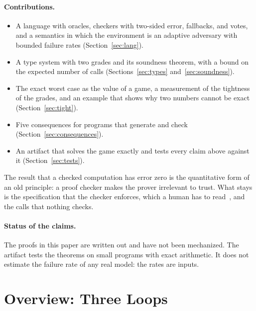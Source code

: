 \documentclass[acmsmall,nonacm,screen]{acmart}
\begin{document}
\paragraph{Contributions.}
\begin{itemize}
\item A language with oracles, checkers with two-sided error, fallbacks, and votes, and a
  semantics in which the environment is an adaptive adversary with bounded failure rates
  (Section~\ref{sec:lang}).
\item A type system with two grades and its soundness theorem, with a bound on the expected
  number of calls (Sections~\ref{sec:types} and~\ref{sec:soundness}).
\item The exact worst case as the value of a game, a measurement of the tightness of the
  grades, and an example that shows why two numbers cannot be exact (Section~\ref{sec:tight}).
\item Five consequences for programs that generate and check (Section~\ref{sec:consequences}).
\item An artifact that solves the game exactly and tests every claim above against it
  (Section~\ref{sec:tests}).
\end{itemize}

The result that a checked computation has error zero is the quantitative form of an old
principle: a proof checker makes the prover irrelevant to trust. What stays is the
specification that the checker enforces, which a human has to read~\citep{tpp1}, and the calls
that nothing checks.

\paragraph{Status of the claims.} The proofs in this paper are written out and have not been
mechanized. The artifact tests the theorems on small programs with exact arithmetic. It does
not estimate the failure rate of any real model: the rates are inputs.

\section{Overview: Three Loops}
\label{sec:overview}
\end{document}
